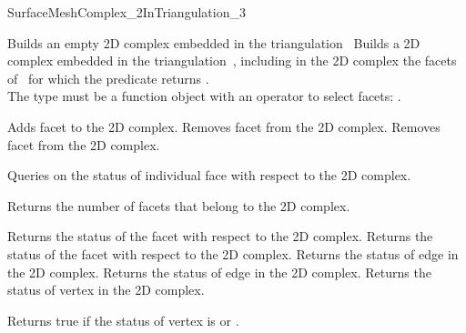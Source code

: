 \begin{ccRefConcept}{SurfaceMeshComplex_2InTriangulation_3}
\ccCreation
{}  %

{}
 {Builds an empty 2D complex embedded in the triangulation~}
\ccGlue
{}
{Builds a 2D complex embedded in the triangulation~,
including in the 2D complex the facets of~ for 
 which the predicate  returns .\\
The type  must be
a function object with an operator to select facets:
.}


\ccGlue
{}
{Adds facet  to the 2D complex.}
\ccGlue
{}
{Removes facet  from  the 2D complex.}
\ccGlue
{}
{Removes facet  from the 2D complex.}

Queries on the status  of individual face with respect to the 2D complex.

{Returns the number of facets that belong to the 2D complex.}

{Returns the status of the facet   with respect to  the 2D complex.}
\ccGlue
{}
{Returns the status of the facet  with respect to  the 2D complex.}
\ccGlue
{}
{Returns the status of edge  in the 2D complex.}
\ccGlue
{}
{Returns the status of edge   in the 2D complex.}
\ccGlue
{}
{Returns the status of vertex  in the 2D complex.}

{Returns true if the status of vertex  is  or .
}
 



\end{ccRefConcept}
